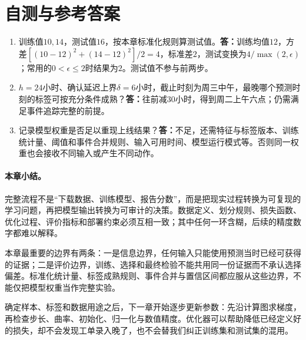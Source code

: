 \section{自测与参考答案}
\begin{enumerate}
\item 训练值$10,14$，测试值$16$，按本章标准化规则算测试值。\textbf{答：}训练均值$12$，方差$[(10-12)^2+(14-12)^2]/2=4$，标准差$2$，测试变换为$4/\max(2,\epsilon)$；常用的$0<\epsilon\leq2$时结果为$2$。测试值不参与前两步。
\item $h=24$小时、确认延迟上界$\delta=6$小时，截止时刻为周三中午，最晚哪个预测时刻的标签可按充分条件成熟？\textbf{答：}往前减$30$小时，得到周二上午六点；仍需满足事件追踪完整的前提。
\item 记录模型权重是否足以重现上线结果？\textbf{答：}不足，还需特征与标签版本、训练统计量、阈值和事件合并规则、输入可用时间、模型运行模式等。否则同一权重也会接收不同输入或产生不同动作。
\end{enumerate}

\paragraph{本章小结。}
完整流程不是“下载数据、训练模型、报告分数”，而是把现实过程转换为可复现的学习问题，再把模型输出转换为可审计的决策。数据定义、划分规则、损失函数、优化过程、评价指标和部署约束必须互相一致；其中任何一环含糊，后续的精度数字都难以解释。

本章最重要的边界有两条：一是信息边界，任何输入只能使用预测当时已经可获得的证据；二是评价边界，训练、选择和最终检验不能共用同一份证据而不承认选择偏差。标准化统计量、标签成熟规则、事件合并与置信区间都应服从这些边界，不能仅把模型权重当作完整实验。

确定样本、标签和数据用途之后，下一章开始逐步更新参数：先沿计算图求梯度，再检查步长、曲率、初始化、归一化与数值精度。优化器可以帮助降低已经定义好的损失，却不会发现工单录入晚了，也不会替我们纠正训练集和测试集的混用。
